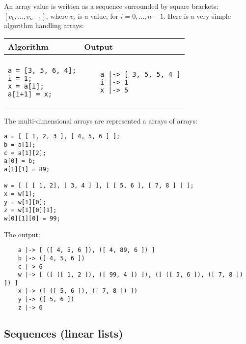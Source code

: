 \documentclass[a4paper]{report}
\begin{document}
An array value is written as a sequence surrounded by square brackets: $[v_0,\ldots,v_{n-1}]$, where $v_i$ is a value, for $i=0,\ldots,n-1$.
Here is a very simple algorithm handling arrays:
\begin{center}
\begin{tabular}{ll}
Algorithm & Output\\
\hline
\\
\begin{minipage}{.35\textwidth}
\begin{verbatim}
a = [3, 5, 6, 4];
i = 1;
x = a[i];
a[i+1] = x;
\end{verbatim}
\end{minipage}
&
\begin{minipage}{.3\textwidth}
\begin{verbatim}
    a |-> [ 3, 5, 5, 4 ]
    i |-> 1
    x |-> 5
\end{verbatim}
\end{minipage}
\end{tabular}
\end{center}
The multi-dimensional arrays are represented a arrays of arrays:
\begin{verbatim}
a = [ [ 1, 2, 3 ], [ 4, 5, 6 ] ]; 
b = a[1];
c = a[1][2];
a[0] = b;
a[1][1] = 89;

w = [ [ [ 1, 2], [ 3, 4 ] ], [ [ 5, 6 ], [ 7, 8 ] ] ];
x = w[1];
y = w[1][0];
z = w[1][0][1];
w[0][1][0] = 99;
\end{verbatim}
The output:
\begin{verbatim}
    a |-> [ ([ 4, 5, 6 ]), ([ 4, 89, 6 ]) ]
    b |-> ([ 4, 5, 6 ])
    c |-> 6
    w |-> [ ([ ([ 1, 2 ]), ([ 99, 4 ]) ]), ([ ([ 5, 6 ]), ([ 7, 8 ]) ]) ]
    x |-> ([ ([ 5, 6 ]), ([ 7, 8 ]) ])
    y |-> ([ 5, 6 ])
    z |-> 6
\end{verbatim}

\subsection{Sequences (linear lists)}
\end{document}
